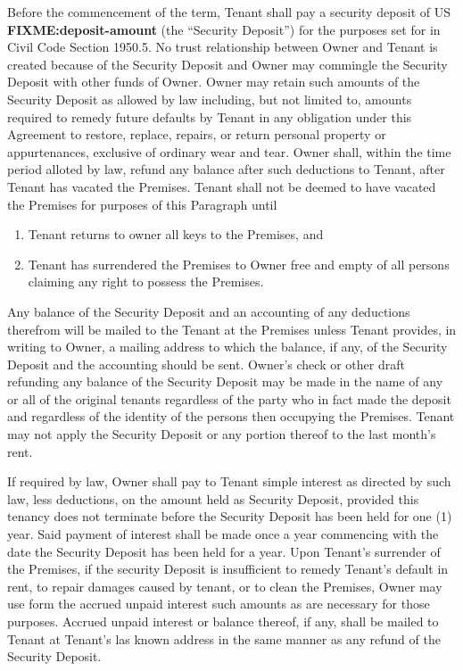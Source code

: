 \documentclass[9pt, letterpaper, oneside]{extarticle}
\newcounter{para}
\newcommand\numparagraph{\par\refstepcounter{para}\textbf{\thepara}\hspace{5mm}}
\newcommand{\depositamount}{FIXME:deposit-amount}
\begin{document}
 \numparagraph{\textbf{SECURITY DEPOSIT:}\hspace{2mm}} Before the commencement of the term, Tenant shall pay a security deposit of US \textbf{\depositamount} (the ``Security Deposit'') for the purposes set for in Civil Code Section 1950.5. No trust relationship between Owner and Tenant is created because of the Security Deposit and Owner may commingle the Security Deposit with other funds of Owner. Owner may retain such amounts of the Security Deposit as allowed by law including, but not limited to, amounts required to remedy future defaults by Tenant in any obligation under this Agreement to restore, replace, repairs, or return personal property or appurtenances, exclusive of ordinary wear and tear. Owner shall, within the time period alloted by law, refund any balance after such deductions to Tenant, after Tenant has vacated the Premises. Tenant shall not be deemed to have vacated the Premises for purposes of this Paragraph until
  \begin{enumerate}
   \item Tenant returns to owner all keys to the Premises, and
   \item Tenant has surrendered the Premises to Owner free and empty of all persons claiming any right to possess the Premises.
   \end{enumerate}
 Any balance of the Security Deposit and an accounting of any deductions therefrom will be mailed to the Tenant at the Premises unless Tenant provides, in writing to Owner, a mailing address to which the balance, if any, of the Security Deposit and the accounting should be sent. Owner's check or other draft refunding any balance of the Security Deposit may be made in the name of any or all of the original tenants regardless of the party who in fact made the deposit and regardless of the identity of the persons then occupying the Premises. Tenant may not apply the Security Deposit or any portion thereof to the last month's rent.

 If required by law, Owner shall pay to Tenant simple interest as directed by such law, less deductions, on the amount held as Security Deposit, provided this tenancy does not terminate before the Security Deposit has been held for one (1) year. Said payment of interest shall be made once a year commencing with the date the Security Deposit has been held for a year. Upon Tenant's surrender of the Premises, if the security Deposit is insufficient to remedy Tenant's default in rent, to repair damages caused by tenant, or to clean the Premises, Owner may use form the accrued unpaid interest such amounts as are necessary for those purposes. Accrued unpaid interest or balance thereof, if any, shall be mailed to Tenant at Tenant's las known address in the same manner as any refund of the Security Deposit.
\end{document}
